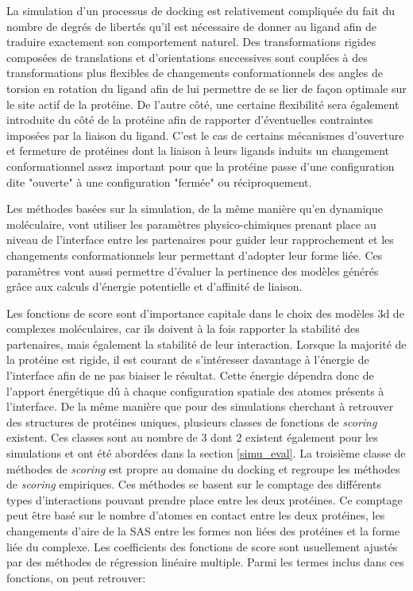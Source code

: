 La simulation d'un processus de docking est relativement compliquée du fait du nombre de degrés de libertés qu'il est nécessaire de donner au ligand afin de traduire exactement son comportement naturel. Des transformations rigides composées de translations et d'orientations successives sont couplées à des transformations plus flexibles de changements conformationnels des angles de torsion en rotation du ligand afin de lui permettre de se lier de façon optimale sur le site actif de la protéine. De l'autre côté, une certaine flexibilité sera également introduite du côté de la protéine afin de rapporter d'éventuelles contraintes imposées par la liaison du ligand. C'est le cas de certains mécanismes d'ouverture et fermeture de protéines dont la liaison à leurs ligands induits un changement conformationnel assez important pour que la protéine passe d'une configuration dite "ouverte" à une configuration "fermée" ou réciproquement.

Les méthodes basées sur la simulation, de la même manière qu'en dynamique moléculaire, vont utiliser les paramètres physico-chimiques prenant place au niveau de l'interface entre les partenaires pour guider leur rapprochement et les changements conformationnels leur permettant d'adopter leur forme liée. Ces paramètres vont aussi permettre d'évaluer la pertinence des modèles générés grâce aux calculs d'énergie potentielle et d'affinité de liaison. 

 \label{docking_eval}

Les fonctions de score sont d'importance capitale dans le choix des modèles 3d de complexes moléculaires, car ils doivent à la fois rapporter la stabilité des partenaires, mais également la stabilité de leur interaction. Lorsque la majorité de la protéine est rigide, il est courant de s'intéresser davantage à l'énergie de l'interface afin de ne pas biaiser le résultat. Cette énergie dépendra donc de l'apport énergétique dû à chaque configuration spatiale des atomes présents à l'interface. De la même manière que pour des simulations cherchant à retrouver des structures de protéines uniques, plusieurs classes de fonctions de \textit{scoring} existent. Ces classes sont au nombre de 3 dont 2 existent également pour les simulations et ont été abordées dans la section \ref{simu_eval}. La troisième classe de méthodes de \textit{scoring} est propre au domaine du docking et regroupe les méthodes de \textit{scoring} empiriques.
Ces méthodes se basent sur le comptage des différents types d'interactions pouvant prendre place entre les deux protéines. Ce comptage peut être basé sur le nombre d'atomes en contact entre les deux protéines, les changements d'aire de la SAS entre les formes non liées des protéines et la forme liée du complexe. Les coefficients des fonctions de score sont usuellement ajustés par des méthodes de régression linéaire multiple. Parmi les termes inclus dans ces fonctions, on peut retrouver:

